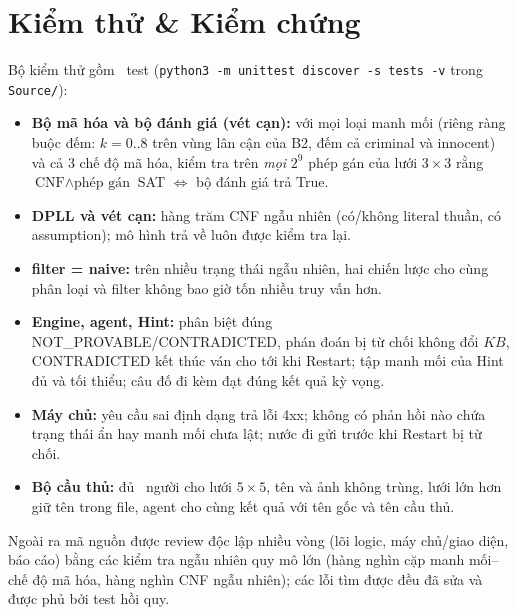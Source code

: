 \documentclass{article}
\newcommand{\code}[1]{\texttt{#1}}
\newcommand{\KB}{\mathit{KB}}
\begin{document}
\section{Kiểm thử \& Kiểm chứng}\label{sec:test}
Bộ kiểm thử gồm \NumTests\ test (\code{python3 -m unittest discover -s tests -v} trong \code{Source/}):
\begin{itemize}[noitemsep]
    \item \textbf{Bộ mã hóa và bộ đánh giá (vét cạn):} với mọi loại manh mối (riêng ràng buộc đếm: $k = 0..8$ trên vùng lân cận của B2, đếm cả criminal và innocent) và cả 3 chế độ mã hóa, kiểm tra trên \textit{mọi} $2^9$ phép gán của lưới $3\times3$ rằng $\text{CNF} \land \text{phép gán}$ SAT $\iff$ bộ đánh giá trả True.
    \item \textbf{DPLL và vét cạn:} hàng trăm CNF ngẫu nhiên (có/không literal thuần, có assumption); mô hình trả về luôn được kiểm tra lại.
    \item \textbf{filter = naive:} trên nhiều trạng thái ngẫu nhiên, hai chiến lược cho cùng phân loại và filter không bao giờ tốn nhiều truy vấn hơn.
    \item \textbf{Engine, agent, Hint:} phân biệt đúng NOT\_PROVABLE/CONTRADICTED, phán đoán bị từ chối không đổi $\KB$, CONTRADICTED kết thúc ván cho tới khi Restart; tập manh mối của Hint đủ và tối thiểu; câu đố đi kèm đạt đúng kết quả kỳ vọng.
    \item \textbf{Máy chủ:} yêu cầu sai định dạng trả lỗi 4xx; không có phản hồi nào chứa trạng thái ẩn hay manh mối chưa lật; nước đi gửi trước khi Restart bị từ chối.
    \item \textbf{Bộ cầu thủ:} đủ \CastFootball\ người cho lưới $5\times5$, tên và ảnh không trùng, lưới lớn hơn giữ tên trong file, agent cho cùng kết quả với tên gốc và tên cầu thủ.
\end{itemize}
Ngoài ra mã nguồn được review độc lập nhiều vòng (lõi logic, máy chủ/giao diện, báo cáo) bằng các kiểm tra ngẫu nhiên quy mô lớn (hàng nghìn cặp manh mối--chế độ mã hóa, hàng nghìn CNF ngẫu nhiên); các lỗi tìm được đều đã sửa và được phủ bởi test hồi quy.

\end{document}
